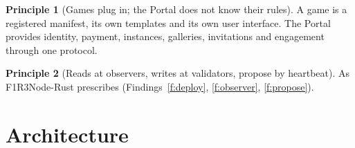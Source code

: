 \documentclass[11pt]{article}
\theoremstyle{definition}
\newtheorem{principle}{Principle}
\theoremstyle{remark}
\newcommand{\Nd}{F1R3Node-Rust}
\begin{document}
\begin{principle}[Games plug in; the Portal does not know their rules]
A game is a registered manifest, its own templates and its own user interface. The
Portal provides identity, payment, instances, galleries, invitations and engagement
through one protocol.
\end{principle}

\begin{principle}[Reads at observers, writes at validators, propose by heartbeat]
As \Nd{} prescribes (Findings~\ref{f:deploy}, \ref{f:observer}, \ref{f:propose}).
\end{principle}

\section{Architecture}\label{sec:arch}
\end{document}
